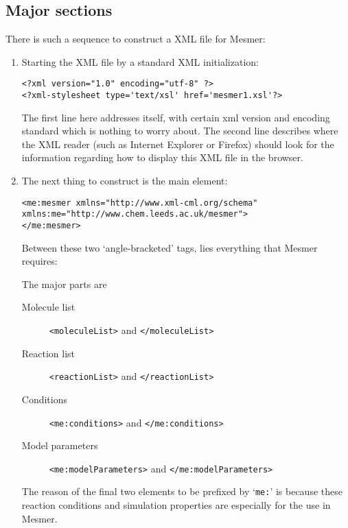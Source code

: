 \subsection{Major sections}\label{sec:MajorSectionsXML}

There is such a sequence to construct a XML file for Mesmer:

\begin{enumerate}
\item  Starting the XML file by a standard XML initialization:
\begin{verbatim}
<?xml version="1.0" encoding="utf-8" ?>
<?xml-stylesheet type='text/xsl' href='mesmer1.xsl'?>
\end{verbatim}

The first line here addresses itself, with certain xml version and encoding standard which is nothing to worry about. The second line describes where the XML reader (such as Internet Explorer or Firefox) should look for the information regarding how to display this XML file in the browser. 


\item  The next thing to construct is the main element:

{\footnotesize
\begin{verbatim}
<me:mesmer xmlns="http://www.xml-cml.org/schema" xmlns:me="http://www.chem.leeds.ac.uk/mesmer">
</me:mesmer>
\end{verbatim}
}

Between these two `angle-bracketed' tags, lies everything that Mesmer requires:

The major parts are 

\begin{description}
\item[Molecule list]{\verb|<moleculeList>| and \verb|</moleculeList>|}
\item[Reaction list]{\verb|<reactionList>| and \verb|</reactionList>|}
\item[Conditions]{\verb|<me:conditions>| and \verb|</me:conditions>|}
\item[Model parameters]{\verb|<me:modelParameters>| and \verb|</me:modelParameters>|}
\end{description}

The reason of the final two elements to be prefixed by `\verb|me:|' is because these reaction conditions and simulation properties are especially for the use in Mesmer. 
\end{enumerate}

